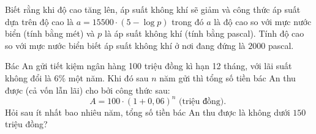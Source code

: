 \begin{vd} %
	Biết rằng khi độ cao tăng lên, áp suất không khí sẽ giảm và công thức áp suất dựa trên độ cao là
	$a=15500 \cdot (5-\log p)$
	trong đó $a$ là độ cao so với mực nước biển (tính bằng mét) và $p$ là áp suất không khí (tính bằng pascal).
	Tính độ cao so với mực nước biển biết áp suất không khí ở nơi đang đứng là $2000$ pascal.
\end{vd}
\begin{vd} %
	Bác An gửi tiết kiệm ngân hàng 100 triệu đồng kì hạn 12 tháng, với lãi suất không đổi là $6 \%$ một năm. Khi đó sau $n$ năm gửi thì tổng số tiền bác An thu được (cả vốn lẫn lãi) cho bởi công thức sau:
	$$
	A=100 \cdot(1+0,06)^n \text { (triệu đồng). }
	$$
	Hỏi sau ít nhất bao nhiêu năm, tổng số tiền bác An thu được là không dưới $150$ triệu đồng?
\end{vd}

